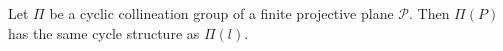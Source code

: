 Let $\Pi$ be a cyclic collineation group of a finite projective plane $\mathcal{P}$. Then $\Pi(P)$ has the same cycle structure as $\Pi(l)$.
